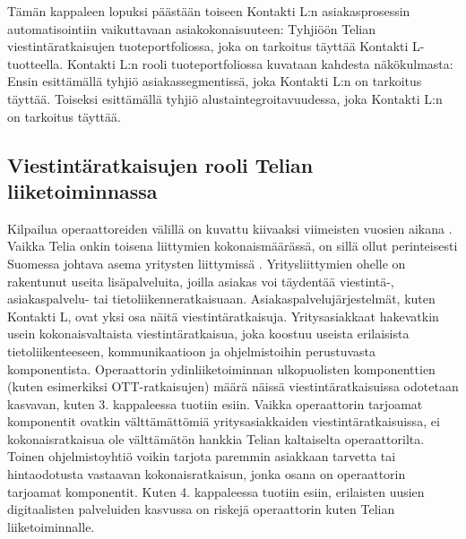 \documentclass[finnish,12pt,a4paper,pdftex]{article}
\begin{document}
Tämän kappaleen lopuksi päästään toiseen Kontakti L:n asiakasprosessin automatisointiin vaikuttavaan asiakokonaisuuteen: Tyhjiöön Telian viestintäratkaisujen tuoteportfoliossa, joka on tarkoitus täyttää Kontakti L-tuotteella. Kontakti L:n rooli tuoteportfoliossa kuvataan kahdesta näkökulmasta: Ensin esittämällä tyhjiö asiakassegmentissä, joka Kontakti L:n on tarkoitus täyttää. Toiseksi esittämällä tyhjiö alustaintegroitavuudessa, joka Kontakti L:n on tarkoitus täyttää.





\subsection{Viestintäratkaisujen rooli Telian liiketoiminnassa}

 Kilpailua operaattoreiden välillä on kuvattu kiivaaksi viimeisten vuosien aikana \citep{hesari}. \\



Vaikka Telia onkin toisena liittymien kokonaismäärässä, on sillä ollut perinteisesti Suomessa johtava asema yritysten liittymissä \citep{hesari}. Yritysliittymien ohelle on rakentunut useita lisäpalveluita, joilla asiakas voi täydentää viestintä-, asiakaspalvelu- tai tietoliikenneratkaisuaan. Asiakaspalvelujärjestelmät, kuten Kontakti L, ovat yksi osa näitä viestintäratkaisuja. Yritysasiakkaat hakevatkin usein kokonaisvaltaista viestintäratkaisua, joka koostuu useista erilaisista tietoliikenteeseen, kommunikaatioon ja ohjelmistoihin perustuvasta komponentista. Operaattorin ydinliiketoiminnan ulkopuolisten komponenttien (kuten esimerkiksi OTT-ratkaisujen) määrä näissä viestintäratkaisuissa odotetaan kasvavan, kuten 3. kappaleessa tuotiin esiin. Vaikka operaattorin tarjoamat komponentit ovatkin välttämättömiä yritysasiakkaiden viestintäratkaisuissa, ei kokonaisratkaisua ole välttämätön hankkia Telian kaltaiselta operaattorilta. Toinen ohjelmistoyhtiö voikin tarjota paremmin asiakkaan tarvetta tai hintaodotusta vastaavan kokonaisratkaisun, jonka osana on operaattorin tarjoamat komponentit. Kuten 4. kappaleessa tuotiin esiin, erilaisten uusien digitaalisten palveluiden kasvussa on riskejä operaattorin kuten Telian liiketoiminnalle.\\
\end{document}

